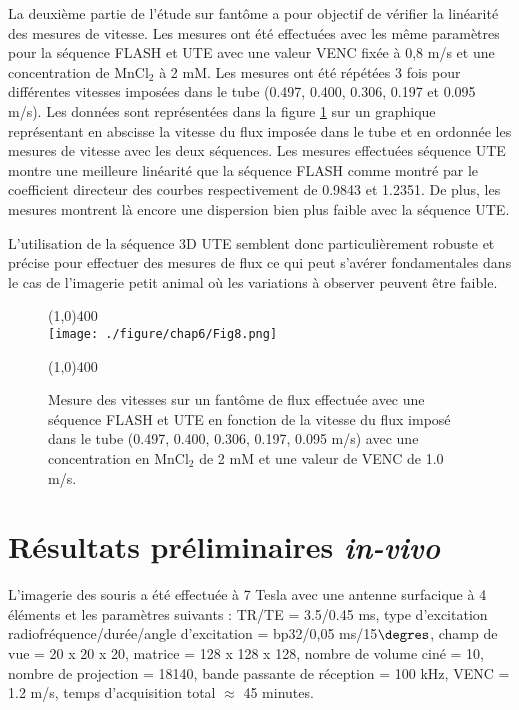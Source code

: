 La deuxième partie de l'étude sur fantôme a pour objectif de vérifier la linéarité des mesures de vitesse. Les mesures ont été effectuées avec les même paramètres pour la séquence FLASH et UTE avec une valeur VENC fixée à 0,8 m/s et une concentration de $\text{MnCl}_2$ à 2 mM. Les mesures ont été répétées 3 fois pour différentes vitesses imposées dans le tube (0.497, 0.400, 0.306, 0.197 et 0.095 m/s). 
Les données sont représentées dans la figure \ref{fig:FluxFantLinear} sur un graphique représentant en abscisse la vitesse du flux imposée dans le tube et en ordonnée les mesures de vitesse avec les deux séquences. Les mesures effectuées séquence UTE montre une meilleure linéarité que la séquence FLASH comme montré par le coefficient directeur des courbes respectivement de 0.9843 et 1.2351. De plus, les mesures montrent là encore une dispersion bien plus faible avec la séquence UTE.

L'utilisation de la séquence 3D UTE semblent donc particulièrement robuste et précise pour effectuer des mesures de flux
ce qui peut s'avérer fondamentales dans le cas de l'imagerie petit animal où les variations à observer peuvent être faible.

\begin{figure}[H]
\centering
\line(1,0){400} \\
\texttt{[image: ./figure/chap6/Fig8.png]}
\caption[Mesure linéarité du flux]{\label{fig:FluxFantLinear} Mesure des vitesses sur un fantôme de flux effectuée avec une séquence FLASH et UTE en fonction de la vitesse du flux imposé dans le tube (0.497, 0.400, 0.306, 0.197, 0.095 m/s) avec une concentration en $\text{MnCl}_2$ de 2 mM et une valeur de VENC de 1.0 m/s.}
\line(1,0){400} \\ 
\end{figure}


\section{Résultats préliminaires \textit{in-vivo}}

L'imagerie des souris a été effectuée à 7 Tesla avec une antenne surfacique à 4 éléments et les paramètres suivants :
TR/TE = 3.5/0.45 ms, type d'excitation radiofréquence/durée/angle d'excitation = bp32/0,05 ms/15$\degres$, champ de vue = 20 x 20 x 20, matrice = 128 x 128 x 128, nombre de volume ciné = 10, nombre de projection  = 18140, bande passante de réception = 100 kHz, VENC = 1.2 m/s, temps d'acquisition total $\approx$ 45 minutes.

